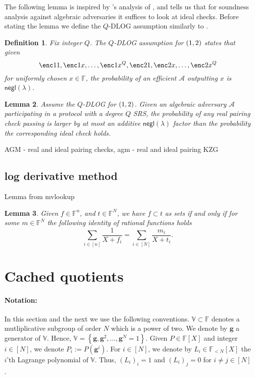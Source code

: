 \documentclass[11pt]{article} %
\newcommand{\F}{\ensuremath{\mathbb F}\xspace}
\newcommand{\adv}{\ensuremath{\mathcal A}\xspace}
\newcommand{\negl}{\ensuremath{\mathsf{negl}(\lambda)}\xspace}
\newcommand{\defeq}{:=}
\newcommand{\set}[1]{\ensuremath{\left\{#1\right\}}\xspace}
\newcommand{\vgen}{\ensuremath{\mathbf{g}}\xspace}
\newcommand{\polysofdeg}[1]{\ensuremath{\F_{< #1}[X]}\xspace}
\newcommand{\sumi}[1]{\sum_{i\in[#1]}}
\newtheorem{lemma}{Lemma}[section]
\newtheorem{dfn}[lemma]{Definition}
\newcommand{\bigspace}{\ensuremath{\mathbb{V}}\xspace}
\newcommand{\witsize}{\ensuremath{n}\xspace}
\newcommand{\tabsize}{\ensuremath{N}\xspace}
\begin{document}
The following lemma is inspired by \cite{AGM}'s analysis of \cite{Groth16},
and tells us that for soundness analysis against algebraic adversaries it suffices to look at ideal checks.
Before stating the lemma we define the $Q$-DLOG assumption similarly to \cite{AGM}.
\begin{dfn}\label{ref:qdlog}
 Fix integer $Q$. The \emph{$Q$-DLOG assumption for $(\G1,\G2)$} states that given 
 \[\enc1{1},\enc1{x},\ldots,\enc1{x^Q},\enc2{1},\enc2{x},\ldots,\enc2{x^Q}\]
 for uniformly chosen $x\in \F$, the probability of an efficient \adv outputting $x$
 is \negl.
\end{dfn}



\begin{lemma}\label{lem:AGManalysis}
Assume the $Q$-DLOG for $(\G1,\G2)$.
 Given an algebraic adversary \adv participating in a protocol with a degree $Q$ SRS,
 the probability of any real pairing check passing is larger by at most an additive \negl factor than the probability the corresponding ideal check holds.
\end{lemma}


AGM - real and ideal pairing checks,
agm - real and ideal pairing 
KZG

\subsection{log derivative method}
Lemma from mvlookup
\begin{lemma}\label{lem:mvlookup}
 Given $f\in \F^\witsize$, and $t\in \F^\tabsize$,
 we have $f\subset t$ as sets if and only if for some $m\in \F^\tabsize$ the following identity of rational functions holds
 \[\sumi{\witsize}\frac{1}{X+f_i}=\sumi{\tabsize}\frac{m_i}{X+t_i}.\]
\end{lemma}

\section{Cached quotients}
\paragraph{Notation:}
In this section and the next we use the following conventions.
$\bigspace\subset \F$ denotes a mutliplicative subgroup of order $N$ which is a power of two.
We denote by \vgen a generator of \bigspace. Hence, $\bigspace=\set{\vgen,\vgen^2,\ldots,\vgen^\tabsize =1}$.
Given $P\in \F[X]$ and integer $i\in [\tabsize]$, we denote $P_i\defeq P(\vgen^i)$.
For $i\in [\tabsize]$, we denote by $L_i\in\polysofdeg{\tabsize}$ the $i$'th Lagrange polynomial of \bigspace. Thus, $(L_i)_i=1$ and $(L_i)_j=0$ for $i\neq j\in [\tabsize]$. 
\end{document}
